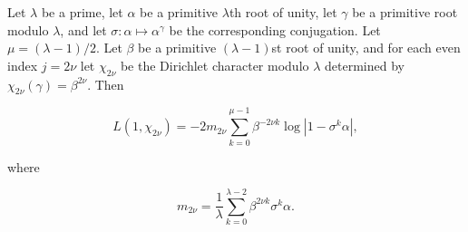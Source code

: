 Let $\lambda$ be a prime, let $\alpha$ be a primitive $\lambda$th root of unity, let $\gamma$ be a primitive root modulo $\lambda$, and let $\sigma : \alpha \mapsto \alpha^\gamma$ be the corresponding conjugation. Let $\mu = (\lambda-1)/2$. Let $\beta$ be a primitive $(\lambda-1)$st root of unity, and for each even index $j = 2\nu$ let $\chi_{2\nu}$ be the Dirichlet character modulo $\lambda$ determined by $\chi_{2\nu}(\gamma) = \beta^{2\nu}$. Then

$$L(1, \chi_{2\nu}) = -2 m_{2\nu} \sum_{k=0}^{\mu-1} \beta^{-2\nu k} \log |1 - \sigma^k \alpha|,$$

where

$$m_{2\nu} = \frac{1}{\lambda} \sum_{k=0}^{\lambda-2} \beta^{2\nu k} \sigma^k \alpha.$$

